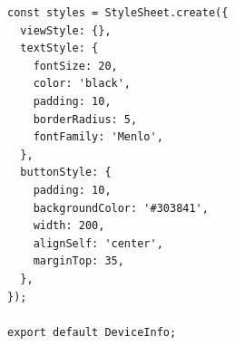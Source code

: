 \documentclass{article}
\begin{document}
\begin{appendices}
\begin{verbatim}
const styles = StyleSheet.create({
  viewStyle: {},
  textStyle: {
    fontSize: 20,
    color: 'black',
    padding: 10,
    borderRadius: 5,
    fontFamily: 'Menlo',
  },
  buttonStyle: {
    padding: 10,
    backgroundColor: '#303841',
    width: 200,
    alignSelf: 'center',
    marginTop: 35,
  },
});

export default DeviceInfo;
\end{verbatim}

\end{appendices}
\end{document}
